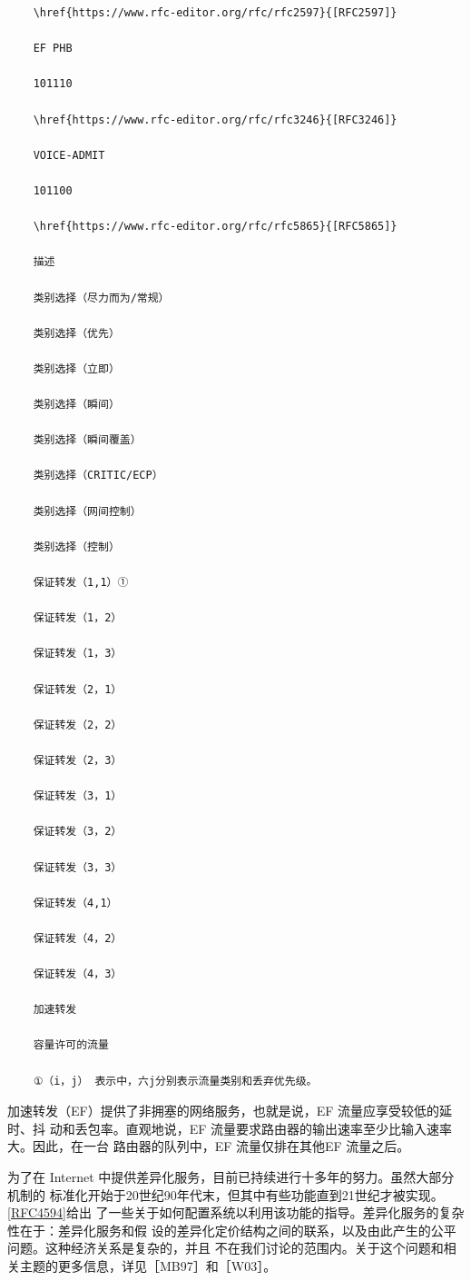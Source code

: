 \begin{verbatim}
    \href{https://www.rfc-editor.org/rfc/rfc2597}{[RFC2597]}
    
    EF PHB
    
    101110
    
    \href{https://www.rfc-editor.org/rfc/rfc3246}{[RFC3246]}
    
    VOICE-ADMIT
    
    101100
    
    \href{https://www.rfc-editor.org/rfc/rfc5865}{[RFC5865]}
    
    描述
    
    类别选择（尽力而为/常规）
    
    类别选择（优先）
    
    类别选择（立即）
    
    类别选择（瞬间）
    
    类别选择（瞬间覆盖）
    
    类别选择（CRITIC/ECP）
    
    类别选择（网间控制）
    
    类别选择（控制）
    
    保证转发（1,1）①
    
    保证转发（1，2）
    
    保证转发（1，3）
    
    保证转发（2，1）
    
    保证转发（2，2）
    
    保证转发（2，3）
    
    保证转发（3，1）
    
    保证转发（3，2）
    
    保证转发（3，3）
    
    保证转发（4,1）
    
    保证转发（4，2）
    
    保证转发（4，3）
    
    加速转发
    
    容量许可的流量
    
    ①（i，j） 表示中，六j分别表示流量类别和丢弃优先级。
\end{verbatim}

加速转发（EF）提供了非拥塞的网络服务，也就是说，EF 流量应享受较低的延时、抖
动和丢包率。直观地说，EF 流量要求路由器的输出速率至少比输入速率大。因此，在一台
路由器的队列中，EF 流量仅排在其他EF 流量之后。

为了在 Internet 中提供差异化服务，目前已持续进行十多年的努力。虽然大部分机制的
标准化开始于20世纪90年代末，但其中有些功能直到21世纪才被实现。\href{https://www.rfc-editor.org/rfc/rfc4594}{[RFC4594]}给出
了一些关于如何配置系统以利用该功能的指导。差异化服务的复杂性在于：差异化服务和假
设的差异化定价结构之间的联系，以及由此产生的公平问题。这种经济关系是复杂的，并且
不在我们讨论的范围内。关于这个问题和相关主题的更多信息，详见［MB97］和［W03］。

